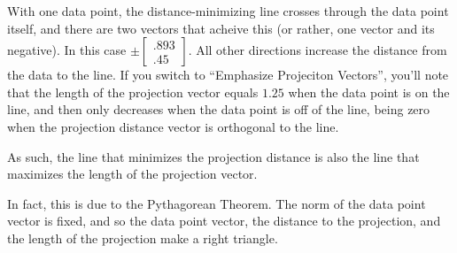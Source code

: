 \documentclass{ximera}
\begin{document}
\begin{problem}

  \begin{selectAll}
  

  \end{selectAll}

  \begin{feedback}
  
    With one data point, the distance-minimizing line crosses through the data point itself, and there are two vectors that acheive this (or rather, one vector and its negative). In this case $\pm \begin{bmatrix}
      .893\\.45
    \end{bmatrix}$. All other directions increase the distance from the data to the line. If you switch to ``Emphasize Projeciton Vectors'', you'll note that the length of the projection vector equals $1.25$ when the data point is on the line, and then only decreases when the data point is off of the line, being zero when the projection distance vector is orthogonal to the line. 

    As such, the line that minimizes the projection distance is also the line that maximizes the length of the projection vector.

    In fact, this is due to the Pythagorean Theorem. The norm of the data point vector is fixed, and so the data point vector, the distance to the projection, and the length of the projection make a right triangle.

    \begin{center}
       

\end{center}
\end{feedback}
\end{problem}
\end{document}
